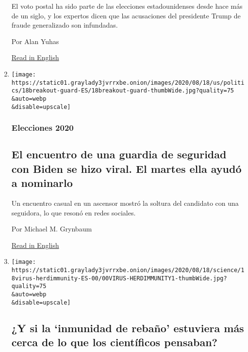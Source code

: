 \begin{enumerate}
  El voto postal ha sido parte de las elecciones estadounidenses desde
  hace más de un siglo, y los expertos dicen que las acusaciones del
  presidente Trump de fraude generalizado son infundadas.

  Por Alan Yuhas

  \href{https://www.nytimes3xbfgragh.onion/article/Vote-by-mail.html}{Read
  in English}
\item
  \href{/es/2020/08/19/espanol/estados-unidos/joe-biden-nominacion-guardia-seguridad.html}{}

  \texttt{[image: https://static01.graylady3jvrrxbe.onion/images/2020/08/18/us/politics/18breakout-guard-ES/18breakout-guard-thumbWide.jpg?quality=75\\\&auto=webp\\\&disable=upscale]}

  \hypertarget{elecciones-2020-4}{%
  \subsubsection{Elecciones 2020}\label{elecciones-2020-4}}

  \hypertarget{el-encuentro-de-una-guardia-de-seguridad-con-biden-se-hizo-viral-el-martes-ella-ayuduxf3-a-nominarlo}{%
  \subsection{El encuentro de una guardia de seguridad con Biden se hizo
  viral. El martes ella ayudó a
  nominarlo}\label{el-encuentro-de-una-guardia-de-seguridad-con-biden-se-hizo-viral-el-martes-ella-ayuduxf3-a-nominarlo}}

  Un encuentro casual en un ascensor mostró la soltura del candidato con
  una seguidora, lo que resonó en redes sociales.

  Por Michael M. Grynbaum

  \href{https://www.nytimes3xbfgragh.onion/2020/08/18/us/politics/nyt-security-guard-joe-biden-nomination.html}{Read
  in English}
\item
  \href{/es/2020/08/18/espanol/ciencia-y-tecnologia/inmunidad-rebano-coronavirus.html}{}

  \texttt{[image: https://static01.graylady3jvrrxbe.onion/images/2020/08/18/science/18virus-herdimmunity-ES-00/00VIRUS-HERDIMMUNITY1-thumbWide.jpg?quality=75\\\&auto=webp\\\&disable=upscale]}

  \hypertarget{y-si-la-inmunidad-de-rebauxf1o-estuviera-muxe1s-cerca-de-lo-que-los-cientuxedficos-pensaban}{%
  \subsection{¿Y si la `inmunidad de rebaño' estuviera más cerca de lo
  que los científicos
  pensaban?}\label{y-si-la-inmunidad-de-rebauxf1o-estuviera-muxe1s-cerca-de-lo-que-los-cientuxedficos-pensaban}}


\end{enumerate}
